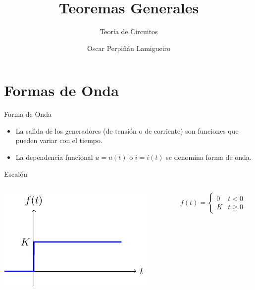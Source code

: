 \documentclass[aspectratio=169, usenames,svgnames,dvipsnames]{beamer}
\author{Oscar Perpiñán Lamigueiro}
\date{}
\title{Teoremas Generales}
\subtitle{Teoría de Circuitos}
\begin{document}
\maketitle

\section{Formas de Onda}
\label{sec:org2b3c8a5}
\begin{frame}[label={sec:orgeabb6c8}]{Forma de Onda}
\begin{itemize}
\item La salida de los generadores (de tensión o de corriente) son funciones que pueden variar con el tiempo.
\item La dependencia funcional \(u = u(t)\) o \(i = i(t)\) se denomina forma de onda.
\end{itemize}
\end{frame}

\begin{frame}[label={sec:orgb3a4319}]{Escalón}
\begin{columns}
\begin{column}{0.5\columnwidth}
\begin{center}
\includegraphics[width=.9\linewidth]{../figs/escalon.pdf}
\end{center}
\end{column}

\begin{column}{0.5\columnwidth}
\[
  f(t) = %
  \begin{cases}
    0 & t < 0\\
    K & t \geq 0
  \end{cases}
  \]
\end{column}
\end{columns}
\end{frame}
\end{document}
